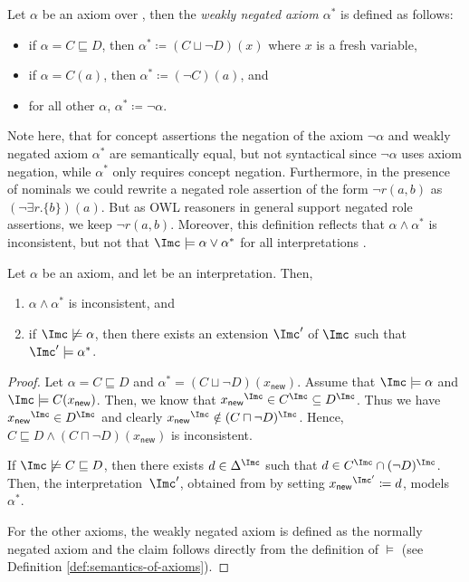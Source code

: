 \begin{definition}
  Let $\alpha$ be an axiom over \Nsig, then the \emph{weakly negated axiom $\alpha^{*}$} is defined
  as follows:
  \begin{itemize}
  \item if $\alpha = C \sqsubseteq D$, then $\alpha^{*} \coloneqq (C \sqcup \lnot D)(x)$ where $x$
    is a fresh variable,
  \item if $\alpha = C(a)$, then $\alpha^{*} \coloneqq (\lnot C)(a)$, and
  \item for all other $\alpha$, $\alpha^{*} \coloneqq \lnot \alpha$. \qedhere
  \end{itemize}
\end{definition}

Note here, that for concept assertions the negation of the axiom $\lnot\alpha$ and weakly negated
axiom $\alpha^{*}$ are semantically equal, but not syntactical since $\lnot\alpha$ uses axiom
negation, while $\alpha^{*}$ only requires concept negation. Furthermore, in the presence of
nominals we could rewrite a negated role assertion of the form $\lnot r(a,b)$ as
$(\lnot\exists r.\{b\})(a)$. But as OWL reasoners in general support negated role assertions, we
keep $\lnot r(a,b)$.  Moreover, this definition reflects that $\alpha\land\alpha^{*}$ is
inconsistent, but not that $\I\models\alpha\lor\alpha^{*}$ for all interpretations \I.

\begin{lemma}\label{lem:weakly-negation-inconsistent}
  Let $\alpha$ be an axiom, and let \I be an interpretation. Then,
  \begin{enumerate}
  \item $\alpha\land\alpha^{*}$ is inconsistent, and
  \item if $\I\not\models\alpha$, then there exists an extension $\I'$ of $\I$ such that $\I'\models\alpha^{*}$.
  \end{enumerate}
\end{lemma}
\begin{proof}
  Let $\alpha = C \sqsubseteq D$ and $\alpha^{*} = (C \sqcup \lnot D)(x_{\mathsf{new}})$. Assume
  that $\I \models \alpha$ and $\I \models C(x_{\mathsf{new}})$.  Then, we know that
  ${x_{\mathsf{new}}}^{\I} \in C^{\I} \subseteq D^{\I}$. Thus we have
  ${x_{\mathsf{new}}}^{\I} \in D^{\I}$ and clearly
  ${x_{\mathsf{new}}}^{\I} \notin (C \sqcap \lnot D)^{\I}$. Hence,
  $C \sqsubseteq D \land (C \sqcap \lnot D)(x_{\mathsf{new}})$ is inconsistent.

  If $\I\not\models C \sqsubseteq D$, then there exists $d\in\Delta^{\I}$ such that
  $d \in C^{\I} \cap (\lnot D)^{\I}$. Then, the interpretation~$\I'$, obtained from \I by setting
  ${x_{\mathsf{new}}}^{\I'} \coloneqq d$, models $\alpha^{*}$.

  For the other axioms, the weakly negated axiom is defined as the normally negated axiom and the
  claim follows directly from the definition of $\models$ (see Definition
  \ref{def:semantics-of-axioms}).
\end{proof}

